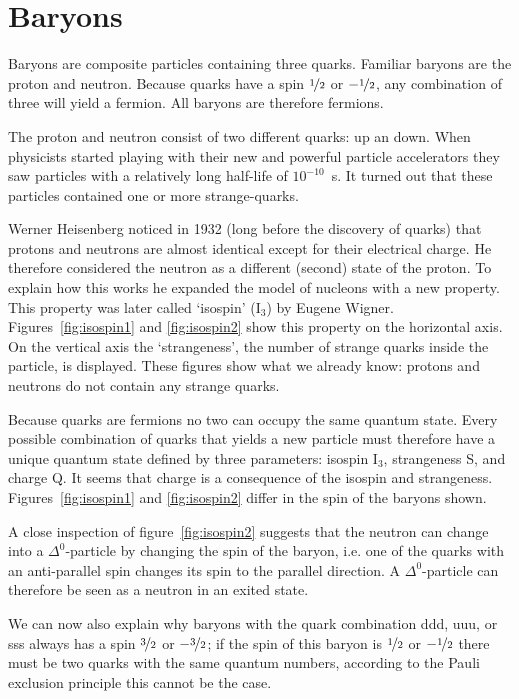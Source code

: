 \section{Baryons}
Baryons are composite particles containing three quarks. Familiar baryons are the proton and neutron. Because quarks have a spin $\nicefrac{1}{2}$ or $-\nicefrac{1}{2}$, any combination of three will yield a fermion. All baryons are therefore fermions.

The proton and neutron consist of two different quarks: up an down. When physicists started playing with their new and powerful particle accelerators they saw particles with a relatively long half-life of $10^{-10}$~s. It turned out that these particles contained one or more strange-quarks.

Werner Heisenberg noticed in 1932 (long before the discovery of quarks) that protons and neutrons are almost identical except for their electrical charge. He therefore considered the neutron as a different (second) state of the proton. To explain how this works he expanded the model of nucleons with a new property. This property was later called `isospin' (I$_3$) by Eugene Wigner. Figures~\ref{fig:isospin1} and \ref{fig:isospin2} show this property on the horizontal axis. On the vertical axis the `strangeness', the number of strange quarks inside the particle, is displayed. These figures show what we already know: protons and neutrons do not contain any strange quarks.

Because quarks are fermions no two can occupy the same quantum state. Every possible combination of quarks that yields a new particle must therefore have a unique quantum state defined by three parameters: isospin I$_3$, strangeness S, and charge Q. It seems that charge is a consequence of the isospin and strangeness. Figures~\ref{fig:isospin1} and \ref{fig:isospin2} differ in the spin of the baryons shown.

A close inspection of figure~\ref{fig:isospin2} suggests that the neutron can change into a $\Delta^0$-particle by changing the spin of the baryon, i.e. one of the quarks with an anti-parallel spin changes its spin to the parallel direction. A $\Delta^0$-particle can therefore be seen as a neutron in an exited state.

We can now also explain why baryons with the quark combination ddd, uuu, or sss always has a spin $\nicefrac{3}{2}$ or $-\nicefrac{3}{2}$; if the spin of this baryon is $\nicefrac{1}{2}$ or $-\nicefrac{1}{2}$ there must be two quarks with the same quantum numbers, according to the Pauli exclusion principle this cannot be the case.


